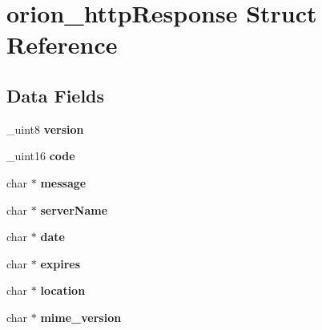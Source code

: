 \hypertarget{structorion__httpResponse}{
\section{orion\_\-httpResponse Struct Reference}
\label{structorion__httpResponse}
}
\subsection*{Data Fields}
\begin{DoxyCompactItemize}
\item 
\hypertarget{structorion__httpResponse_a66448dd48b6943fcdb38c26676ce1da2}{
\_\-uint8 {\bfseries version}}
\label{structorion__httpResponse_a66448dd48b6943fcdb38c26676ce1da2}

\item 
\hypertarget{structorion__httpResponse_ac1b503937ec426e43bcecc35d8e3abb2}{
\_\-uint16 {\bfseries code}}
\label{structorion__httpResponse_ac1b503937ec426e43bcecc35d8e3abb2}

\item 
\hypertarget{structorion__httpResponse_a727cb1a29b2f86105987f32925cdd093}{
char $\ast$ {\bfseries message}}
\label{structorion__httpResponse_a727cb1a29b2f86105987f32925cdd093}

\item 
\hypertarget{structorion__httpResponse_a6ac6b482e13001c6638d4bd3640df5b3}{
char $\ast$ {\bfseries serverName}}
\label{structorion__httpResponse_a6ac6b482e13001c6638d4bd3640df5b3}

\item 
\hypertarget{structorion__httpResponse_a50a6c19e8816251771a937e0174a0811}{
char $\ast$ {\bfseries date}}
\label{structorion__httpResponse_a50a6c19e8816251771a937e0174a0811}

\item 
\hypertarget{structorion__httpResponse_a06eef6c38cd80ac50b32b0bba3ba715d}{
char $\ast$ {\bfseries expires}}
\label{structorion__httpResponse_a06eef6c38cd80ac50b32b0bba3ba715d}

\item 
\hypertarget{structorion__httpResponse_a7a944d185ca433cc1e14149baa5d331e}{
char $\ast$ {\bfseries location}}
\label{structorion__httpResponse_a7a944d185ca433cc1e14149baa5d331e}

\item 
\hypertarget{structorion__httpResponse_aad2b284eabf64b4c613acdf1b0d96543}{
char $\ast$ {\bfseries mime\_\-version}}
\label{structorion__httpResponse_aad2b284eabf64b4c613acdf1b0d96543}


\end{DoxyCompactItemize}
